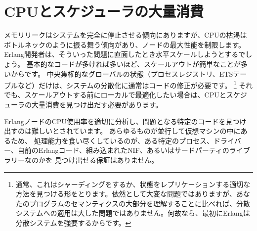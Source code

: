 \chapter{CPUとスケジューラの大量消費}
\label{chap:cpu-hogs}

メモリリークはシステムを完全に停止させる傾向にありますが、CPUの枯渇はボトルネックのように振る舞う傾向があり、ノードの最大性能を制限します。
Erlang開発者は、そういった問題に直面したとき水平スケールしようとするでしょう。
基本的なコードが多ければ多いほど、スケールアウトが簡単なことが多いからです。
中央集権的なグローバルの状態（プロセスレジストリ、ETSテーブルなど）だけは、システムの分散化に通常はコードの修正が必要です。
\footnote{通常、これはシャーディングをするか、状態をレプリケーションする適切な方法を見つける形をとります。依然として大変な問題ではありますが、あなたのプログラムのセマンティクスの大部分を理解することに比べれば、分散システムへの適用は大した問題ではありません。何故なら、最初にErlangは分散システムを強要するからです。}
それでも、スケールアウトする前にローカルで最適化したい場合は、CPUとスケジューラの大量消費を見つけ出だす必要があります。

ErlangノードのCPU使用率を適切に分析し、問題となる特定のコードを見つけ出すのは難しいとされています。
あらゆるものが並行して仮想マシンの中にあるため、
処理能力を食い尽くしているのが、ある特定のプロセス、ドライバー、自前のErlangコード、組み込まれたNIF、あるいはサードパーティのライブラリーなのかを
見つけ出せる保証はありません。

